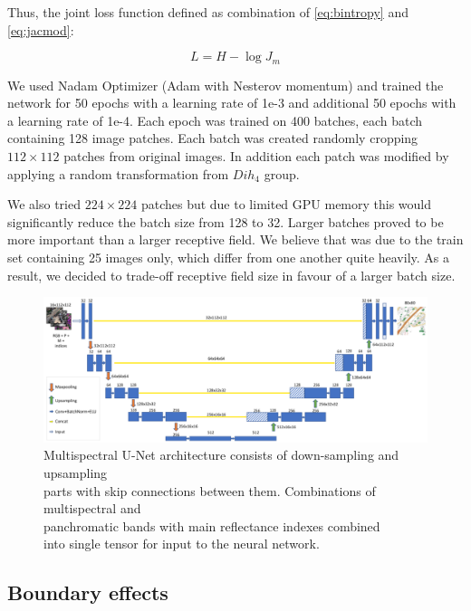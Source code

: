 \documentclass[10pt,twocolumn,letterpaper]{article}
\begin{document}
Thus, the joint loss function defined as combination of \ref{eq:bintropy} and \ref{eq:jacmod}:

\begin{equation}
L = H - \log J_{m}
\end{equation}

We used Nadam Optimizer (Adam with Nesterov momentum) \cite{nadam} and trained the network for 50 epochs with a learning rate of 1e-3 and additional 50 epochs with a learning rate of 1e-4. Each epoch was trained on 400 batches, each batch containing 128 image patches. Each batch was created randomly cropping $112 \times 112$ patches from original images. In addition each patch was modified by applying a random transformation from $Dih_4$ group.

We also tried $224 \times 224$ patches but due to limited GPU memory this would significantly reduce the batch size from 128 to 32. Larger batches proved to be more important than a larger receptive field. We believe that was due to the train set containing 25 images only, which differ from one another quite heavily. As a result, we decided to trade-off receptive field size in favour of a larger batch size.

\begin{figure}[th]
	\centering
	\includegraphics[scale=0.28]{unet}
	\captionsetup{justification=centering}
	\caption{Multispectral U-Net architecture consists of down-sampling and upsampling \\ parts with skip connections between them.  Combinations of multispectral and \\ panchromatic bands with main reflectance indexes combined \\ into single tensor for input to the neural network. }
	\label{fig:unet}
\end{figure}

\subsection{Boundary effects}
\end{document}
